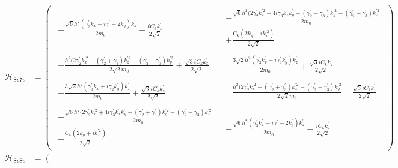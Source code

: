 \begin{align*}
\mathcal{H}_{8v7v} &=\left(
 \begin{array}{c|c}
\begin{array}{c}
-\frac{\sqrt{6}\hbar^2(\gamma_3^{'}k_x^{'} -i\gamma^{'} -2k_y^{'})k_z^{'}}{2m_0} -\frac{iC_kk_z^{'}}{2\sqrt{2}}
\end{array}
&\begin{array}{c}
 -\frac{\sqrt{6}\hbar^2(2\gamma_2^{'}k_x^{'2} -4i\gamma_3^{'}k_x^{'}k_y^{'} -(\gamma_2^{'}+\gamma_3^{'})k_y^{'2}-(\gamma_2^{'}-\gamma_3^{'})k_z^{'2}}{2m_0}\\
 +\frac{C_k(2k_y -ik_x^{'2})}{ 2\sqrt{2}}
\end{array}
\\ \hline
\begin{array}{c}
-\frac{\hbar^2(2\gamma_2^{'}k_x^{'2} -(\gamma_2^{'}+\gamma_3^{'})k_z^{'2}-(\gamma_2^{'}-\gamma_3^{'})k_y^{'2}}{2\sqrt{2}m_0}+\frac{\sqrt{3}iC_kk_x^{'}}{ 2\sqrt{2}}
\end{array}
&\begin{array}{c}
-\frac{3\sqrt{2}\hbar^2(\gamma_3^{'}k_x^{'} -i\gamma_2^{'}k_y^{'})k_z^{'}}{2m_0} +\frac{\sqrt{3}iC_kk_z^{'}}{2\sqrt{2}}
\end{array}
\\ \hline
\begin{array}{c}
-\frac{3\sqrt{2}\hbar^2(\gamma_3^{'}k_x^{'} +i\gamma_2^{'}k_y^{'})k_z^{'}}{2m_0} +\frac{\sqrt{3}iC_kk_z^{'}}{2\sqrt{2}}
\end{array}
&\begin{array}{c}
-\frac{\hbar^2(2\gamma_2^{'}k_x^{'2} -(\gamma_2^{'}+\gamma_3^{'})k_z^{'2}-(\gamma_2^{'}-\gamma_3^{'})k_y^{'2}}{2\sqrt{2}m_0}-\frac{\sqrt{3}iC_kk_x^{'}}{ 2\sqrt{2}}
\end{array}
\\\hline
\begin{array}{c}
 -\frac{\sqrt{6}\hbar^2(2\gamma_2^{'}k_x^{'2} +4i\gamma_3^{'}k_x^{'}k_y^{'} -(\gamma_2^{'}+\gamma_3^{'})k_y^{'2}-(\gamma_2^{'}-\gamma_3^{'})k_z^{'2}}{2m_0}\\
 +\frac{C_k(2k_y +ik_x^{'2})}{ 2\sqrt{2}}
\end{array}
&\begin{array}{c}
-\frac{\sqrt{6}\hbar^2(\gamma_3^{'}k_x^{'} +i\gamma^{'} -2k_y^{'})k_z^{'}}{2m_0} -\frac{iC_kk_z^{'}}{2\sqrt{2}}
\end{array}
\end{array}\right)\\
 \mathcal{H}_{8v8v} &=\left(

\end{align*}
